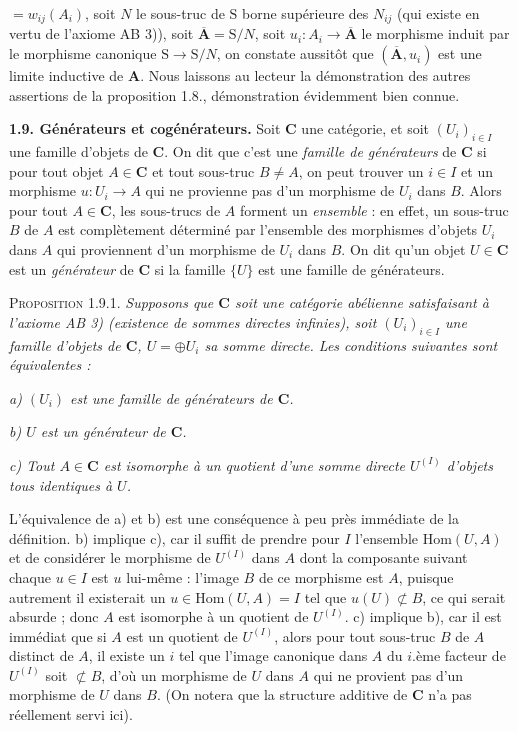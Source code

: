 
\noindent $=w_{ij}(A_i)$, soit $N$ le sous-truc de $\mathrm{S}$ borne supérieure des
$N_{ij}$ (qui existe en vertu de l'axiome AB 3)), soit
$\overline{\mathbf A}=\mathrm{S}/N$, soit $u_i:A_i\to\overline{\mathbf A}$ le morphisme
induit par le morphisme canonique $\mathrm{S}\to \mathrm{S}/N$, on constate aussitôt
que $(\overline{\mathbf A},u_i)$ est une limite inductive de $\mathbf A$. Nous laissons
au lecteur la démonstration des autres assertions de la proposition 1.8.,
démonstration évidemment bien connue.

\textbf{1.9. Générateurs et cogénérateurs.} Soit $\mathbf{C}$ une catégorie,
et soit $(U_i)_{i\in I}$ une famille d'objets de $\mathbf{C}$. On dit que c'est une
\textit{famille de générateurs} de $\mathbf{C}$ si pour tout objet $A\in \mathbf{C}$ et tout
sous-truc $B\neq A$, on peut trouver un $i\in I$ et un morphisme
$u:U_i\to A$ qui ne provienne pas d'un morphisme de $U_i$ dans
$B$. Alors pour tout $A\in \mathbf{C}$, les sous-trucs de $A$ forment un
\textit{ensemble} : en effet, un sous-truc $B$ de $A$ est complètement
déterminé par l'ensemble des morphismes d'objets $U_i$ dans $A$ qui proviennent
d'un morphisme de $U_i$ dans $B$. On dit qu'un objet $U\in \mathbf{C}$ est un
\textit{générateur} de $\mathbf{C}$ si la famille $\{U\}$ est une famille de
générateurs.

\textsc{Proposition 1.9.1.} \textit{Supposons que $\mathbf{C}$ soit une
catégorie abélienne satisfaisant à l'axiome \textup{AB 3)} (existence de sommes directes
infinies), soit $(U_i)_{i\in I}$ une famille d'objets de $\mathbf{C}$,
$U=\oplus U_i$ sa somme directe. Les conditions suivantes sont
équivalentes :}

\textit{a) $(U_i)$ est une famille de générateurs de $\mathbf{C}$.}

\textit{b) $U$ est un générateur de $\mathbf{C}$.}

\textit{c) Tout $A\in \mathbf{C}$ est isomorphe à un quotient d'une somme
directe $U^{(I)}$ d'objets tous identiques à $U$.}

L'équivalence de a) et b) est une conséquence à peu près immédiate de la
définition. b) implique c), car il suffit de prendre pour $I$ l'ensemble
$\mathrm{Hom}(U,A)$ et de considérer le morphisme de $U^{(I)}$ dans $A$ dont
la composante suivant chaque $u\in I$ est $u$ lui-même : l'image $B$ de ce
morphisme est $A$, puisque autrement il existerait un
$u\in\mathrm{Hom}(U,A)=I$ tel que $u(U)\not\subset B$, ce qui serait absurde ;
donc $A$ est isomorphe à un quotient de $U^{(I)}$. c) implique b), car il est
immédiat que si $A$ est un quotient de $U^{(I)}$, alors pour tout sous-truc
$B$ de $A$ distinct de $A$, il existe un $i$ tel que l'image canonique dans
$A$ du $i$.ème facteur de $U^{(I)}$ soit $\not\subset B$, d'où un morphisme de
$U$ dans $A$ qui ne provient pas d'un morphisme de $U$ dans $B$. (On notera
que la structure additive de $\mathbf{C}$ n'a pas réellement servi ici).

